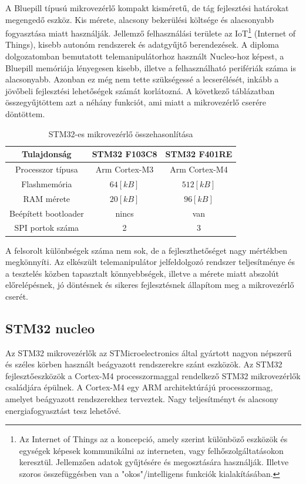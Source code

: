 A Bluepill típusú mikrovezérlő kompakt kisméretű, de tág fejlesztési határokat megengedő eszköz. Kis mérete, alacsony bekerülési költsége és alacsonyabb fogyasztása miatt használják. Jellemző felhasználási területe az IoT\footnote{Az Internet of Things az a koncepció, amely szerint különböző eszközök és egységek képesek kommunikálni az interneten, vagy felhőszolgáltatásokon keresztül. Jellemzően adatok gyűjtésére és megosztására használják. Illetve szoros összefüggésben van a "okos"/intelligens funkciók kialakításában.} (Internet of Things), kisebb autonóm rendszerek és adatgyűjtő berendezések. A diploma dolgozatomban bemutatott telemanipulátorhoz használt Nucleo-hoz képest, a Bluepill memóriája lényegesen kisebb, illetve a felhasználható perifériák száma is alacsonyabb. Azonban ez még nem tette szükségessé a lecserélését, inkább a jövőbeli fejlesztési lehetőségek számát korlátozná. A következő táblázatban összegyűjtöttem azt a néhány funkciót, ami miatt a mikrovezérlő cserére döntöttem.

\begin{table}[!h]
\begin{center}
    \begin{tabular}{|c c c|} 
        \hline
        Tulajdonság & STM32 F103C8 & STM32 F401RE  \\ 
        \hline
        Processzor típusa     &  Arm Cortex-M3  &  Arm Cortex-M4  \\
        Flashmemória          & $64[kB]$        & $512[kB]$       \\
        RAM mérete            & $20[kB]$    	& $96[kB]$        \\
        Beépített bootloader  & nincs           & van             \\
        SPI portok száma      & 2               & 3               \\
        \hline
    \end{tabular}
    \caption{STM32-es mikrovezérlő összehasonlítása}
\end{center}
\end{table}

A felsorolt különbségek száma nem sok, de a fejleszthetőséget nagy mértékben megkönnyíti. Az elkészült telemanipulátor jelfeldolgozó rendszer teljesítménye és a tesztelés közben tapasztalt könnyebbségek, illetve a mérete miatt abszolút előrelépésnek, jó döntésnek és sikeres fejlesztésnek állapítom meg a mikrovezérlő cserét.


\subsection{STM32 nucleo}
\label{sec:STM32_nucleo}
Az STM32 mikrovezérlők az STMicroelectronics által gyártott nagyon népszerű és széles körben használt beágyazott rendszerekre szánt eszközök. Az STM32 fejlesztőeszközök a Cortex-M4 processzormaggal rendelkező STM32 mikrovezérlők családjára épülnek. A Cortex-M4 egy ARM architektúrájú processzormag, amelyet beágyazott rendszerekhez terveztek. Nagy teljesítményt és alacsony energiafogyasztást tesz lehetővé.

